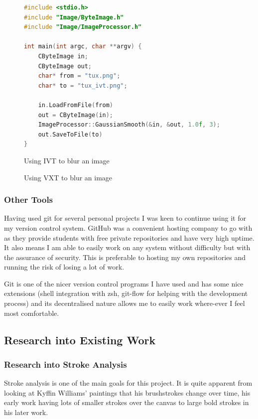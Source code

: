 \documentclass[11pt,fleqn,twoside]{article}
\begin{document}
\begin{figure}[p]
\begin{lstlisting}[language=C++]
#include <stdio.h>
#include "Image/ByteImage.h"
#include "Image/ImageProcessor.h"

int main(int argc, char **argv) {
	CByteImage in;
	CByteImage out;
	char* from = "tux.png";
	char* to = "tux_ivt.png";

	in.LoadFromFile(from)
	out = CByteImage(in);
	ImageProcessor::GaussianSmooth(&in, &out, 1.0f, 3);
	out.SaveToFile(to)
}
\end{lstlisting}
\caption{Using IVT to blur an image}
\label{fig:ivt}
\end{figure}

\begin{figure}[p]
\caption{Using VXT to blur an image}
\label{fig:vxt}
\end{figure}

\subsubsection{Other Tools}
Having used git for several personal projects I was keen to continue using it for my version 
control system. GitHub was a convenient hosting company to go with as they provide students with 
free private repositories and have very high uptime. It also means I am able to easily work on any 
system without difficulty but with the assurance of security. This is preferable to hosting my own
repositories and running the risk of losing a lot of work.

Git is one of the nicer version control programs I have used and has some nice extensions (shell
integration with zsh, git-flow for helping with the development process) and its decentralised 
nature allows me to easily work where-ever I feel most comfortable.

\clearpage
\subsection{Research into Existing Work}

\subsubsection{Research into Stroke Analysis}
Stroke analysis is one of the main goals for this project. It is quite apparent from looking at 
Kyffin Williams' paintings that his brushstrokes change over time, his early work having lots of
smaller strokes over the canvas to large bold strokes in his later work.
\end{document}

